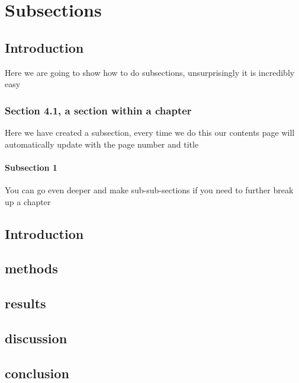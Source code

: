\documentclass[../main.tex]{subfiles}
\begin{document}
\chapter{Subsections}
\minitoc \mtcskip 


\section{Introduction}
Here we are going to show how to do subsections, unsurprisingly it is incredibly easy

\subsection{Section 4.1, a section within a chapter}
Here we have created a subsection, every time we do this our contents page will automatically update with the page number and title

\subsubsection{Subsection 1}
You can go even deeper and make sub-sub-sections if you need to further break up a chapter

\section{Introduction}
\section{methods}
\section{results}
\section{discussion}
\section{conclusion}
\end{document}
